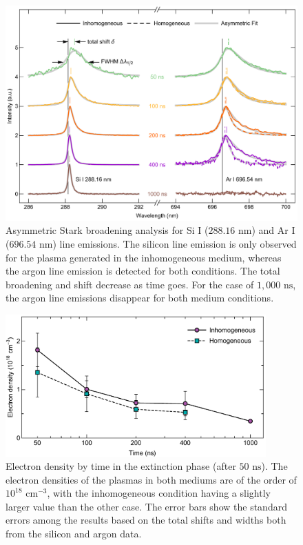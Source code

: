 \begin{figure}[t!]
\centering
\includegraphics[width=130mm]{figures/ch4/Stark/fit.pdf}
\caption{Asymmetric Stark broadening analysis for Si I ($288.16 \text{ nm}$) and Ar I ($696.54 \text{ nm}$) line emissions. The silicon line emission is only observed for the plasma generated in the inhomogeneous medium, whereas the argon line emission is detected for both conditions. The total broadening and shift decrease as time goes. For the case of $1,000 \text{ ns}$, the argon line emissions disappear for both medium conditions.}
\label{fig:StarkFit}
\end{figure}

\begin{figure}[ht!]
\centering
\includegraphics[width=100mm]{figures/ch4/Stark/density.pdf}
\caption{Electron density by time in the extinction phase (after $50 \text{ ns}$). The electron densities of the plasmas in both mediums are of the order of $10^{18} \text{ cm}^{-3}$, with the inhomogeneous condition having a slightly larger value than the other case. The error bars show the standard errors among the results based on the total shifts and widths both from the silicon and argon data.}
\label{fig:StarkDensity}
\end{figure}

